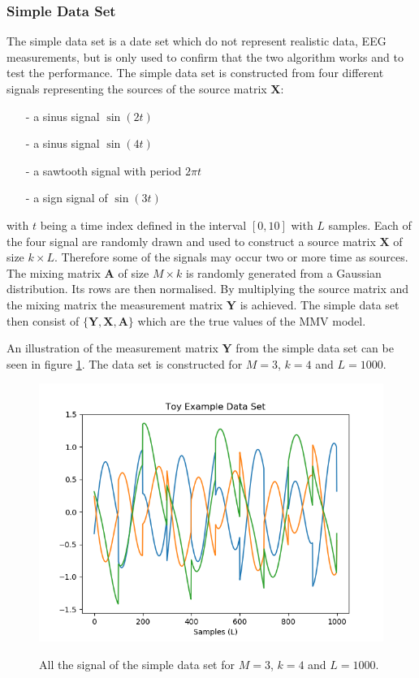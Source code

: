 \subsubsection{Simple Data Set}
The simple data set is a date set which do not represent realistic data, EEG measurements, but is only used to confirm that the two algorithm works and to test the performance.
The simple data set is constructed from four different signals representing the sources of the source matrix $\mathbf{X}$: 
\begin{itemize}
\item[-] a sinus signal $\sin(2t)$
\item[-] a sinus signal $\sin(4t)$
\item[-] a sawtooth signal with period $2 \pi t$
\item[-] a sign signal of $\sin(3t)$
\end{itemize}
with $t$ being a time index defined in the interval $[0,10]$ with $L$ samples. Each of the four signal are randomly drawn and used to construct a source matrix $\mathbf{X}$ of size $k \times L$. Therefore some of the signals may occur two or more time as sources.
The mixing matrix $\mathbf{A}$ of size $M \times k$ is randomly generated from a Gaussian distribution. Its rows are then normalised. 
By multiplying the source matrix and the mixing matrix the measurement matrix $\mathbf{Y}$ is achieved.
The simple data set then consist of $\{ \mathbf{Y}, \mathbf{X}, \mathbf{A} \}$ which are the true values of the MMV model.

An illustration of the measurement matrix $\mathbf{Y}$ from the simple data set can be seen in figure \ref{fig:mix}. The data set is constructed for $M = 3$, $k = 4$ and $L = 1000$.
\begin{figure}[H]
\centering
\includegraphics[scale=0.5]{figures/chapter6/Mix_Data_m3_n4_k4_L1000.png}
\label{fig:mix}
\caption{All the signal of the simple data set for $M = 3$, $k=4$ and $L=1000$.}
\end{figure}
\noindent

